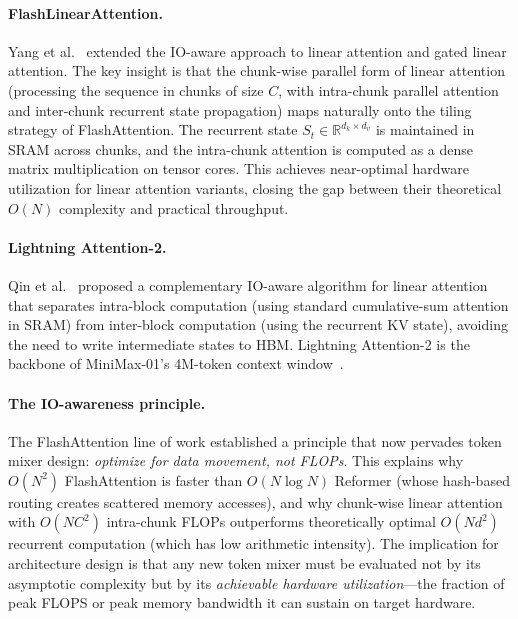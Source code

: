 \documentclass[11pt,a4paper]{article}
\begin{document}
\paragraph{FlashLinearAttention.}
Yang et al.~\cite{yang2024gla} extended the IO-aware approach to linear attention and gated linear attention. The key insight is that the chunk-wise parallel form of linear attention (processing the sequence in chunks of size $C$, with intra-chunk parallel attention and inter-chunk recurrent state propagation) maps naturally onto the tiling strategy of FlashAttention. The recurrent state $S_t \in \mathbb{R}^{d_k \times d_v}$ is maintained in SRAM across chunks, and the intra-chunk attention is computed as a dense matrix multiplication on tensor cores. This achieves near-optimal hardware utilization for linear attention variants, closing the gap between their theoretical $O(N)$ complexity and practical throughput.

\paragraph{Lightning Attention-2.}
Qin et al.~\cite{qin2024lightning2} proposed a complementary IO-aware algorithm for linear attention that separates intra-block computation (using standard cumulative-sum attention in SRAM) from inter-block computation (using the recurrent KV state), avoiding the need to write intermediate states to HBM. Lightning Attention-2 is the backbone of MiniMax-01's 4M-token context window~\cite{minimax2025}.

\paragraph{The IO-awareness principle.}
The FlashAttention line of work established a principle that now pervades token mixer design: \emph{optimize for data movement, not FLOPs}. This explains why $O(N^2)$ FlashAttention is faster than $O(N \log N)$ Reformer (whose hash-based routing creates scattered memory accesses), and why chunk-wise linear attention with $O(NC^2)$ intra-chunk FLOPs outperforms theoretically optimal $O(Nd^2)$ recurrent computation (which has low arithmetic intensity). The implication for architecture design is that any new token mixer must be evaluated not by its asymptotic complexity but by its \emph{achievable hardware utilization}---the fraction of peak FLOPS or peak memory bandwidth it can sustain on target hardware.



\end{document}
